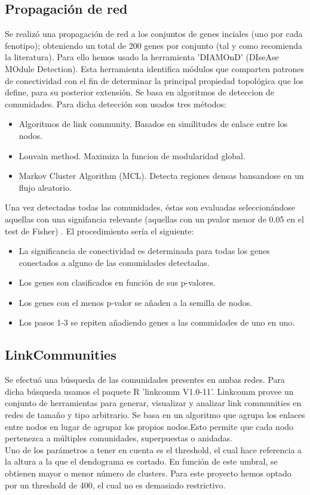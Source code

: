 \subsection*{Propagación de red}
Se realizó una propagación de red a los conjuntos de genes inciales (uno por cada fenotipo); obteniendo un total de 200 genes por conjunto (tal y como recomienda la literatura).\cite{Ghiassian2015} Para ello hemos usado la herramienta 'DIAMOnD' (DIseAse MOdule Detection). Esta herramienta identifica módulos que comparten 	
patrones de conectividad con el fin de determinar la principal propiedad topológica que los define, para su posterior extensión. \cite{Ghiassian2015} Se basa en algoritmos de deteccion de comunidades. Para dicha detección son usados tres métodos:
    \begin{itemize}
        \item Algoritmos de link community. Basados en similitudes de enlace entre los nodos. \cite{Ahn2010}
        \item Louvain method. Maximiza la funcion de modularidad global.\cite{Sanyal2006} 
        \item Markov Cluster Algorithm (MCL). Detecta regiones densas bansandose en un flujo aleatorio. \cite{MCL}
    \end{itemize}

Una vez detectadas todas las comunidades, éstas son evaluadas seleccionándose aquellas con una signifancia relevante (aquellas con un pvalor menor de 0.05 en el test de Fisher) \cite{Jafari2018}. El procedimiento sería el siguiente:
    \begin{itemize}
        \item La significancia de conectividad es determinada para todas los genes conectados a alguno de las comunidades detectadas.
        \item Los genes son clasificados en función de sus p-valores.
        \item Los genes con el menos p-valor se añaden a la semilla de nodos.
        \item Los pasos 1-3 se repiten añadiendo genes a las comunidades de uno en uno.
    \end{itemize}

\subsection*{LinkCommunities}
Se efectuó una búsqueda de  las comunidades presentes en ambas redes. Para dicha búsqueda usamos el paquete R 'linkcomm V1.0-11'. Linkcomm provee un conjunto de herramientas para generar, visualizar y analizar link communities en redes de tamaño y tipo arbitrario.  \cite{Kalinka2011} Se basa en un algoritmo que agrupa  los enlaces entre nodos en lugar de  agrupar los propios nodos.Esto permite que cada nodo pertenezca a múltiples comunidades, superpuestas o anidadas. \cite{Kalinka2011} 
\\
Uno de los parámetros a tener en cuenta es el threshold, el cual hace referencia a la altura a la que el dendograma es cortado. En función de este umbral, se obtienen mayor o menor número de clusters. Para este proyecto hemos optado por un threshold de 400, el cual no es demasiado restrictivo.



